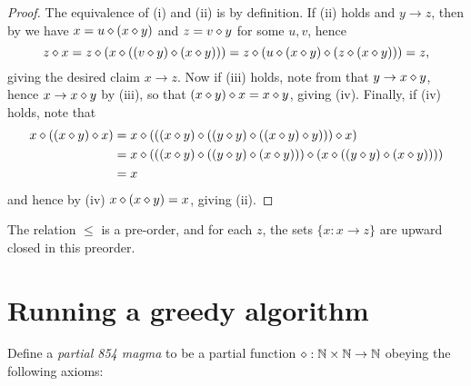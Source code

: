 \begin{proof}  The equivalence of (i) and (ii) is by definition.  If (ii) holds and $y \to z$, then by  we have $x = u \diamond (x \diamond y)$ and $z = v \diamond y$ for some $u,v$, hence
  $$ z \diamond x = z \diamond (x \diamond ((v \diamond y) \diamond (x \diamond y))) = z \diamond (u \diamond (x \diamond y) \diamond (z \diamond (x \diamond y))) = z,$$
giving the desired claim $x \to z$.  Now if (iii) holds, note from  that $y \to x \diamond y$, hence $x \to x \diamond y$ by (iii), so that $(x \diamond y) \diamond x = x \diamond y$, giving (iv).  Finally, if (iv) holds, note that
\begin{align*}
  x \diamond ((x \diamond y) \diamond x) &= x \diamond ( ((x \diamond y) \diamond ((y \diamond y) \diamond ((x \diamond y) \diamond y))) \diamond x) \\
  &= x \diamond (((x \diamond y) \diamond ((y \diamond y) \diamond (x \diamond y))) \diamond (x \diamond ((y \diamond y) \diamond (x \diamond y)))) \\
  &= x
\end{align*}
and hence by (iv) $x \diamond (x \diamond y) = x$, giving (ii).
\end{proof}

\begin{corollary}  The relation $\leq$ is a pre-order, and for each $z$, the sets $\{ x: x \to z \}$ are upward closed in this preorder.
\end{corollary}



\section{Running a greedy algorithm}

Define a \emph{partial 854 magma} to be a partial function $\diamond: \mathbb{N} \times \mathbb{N} \to \mathbb{N}$ obeying the following axioms:

